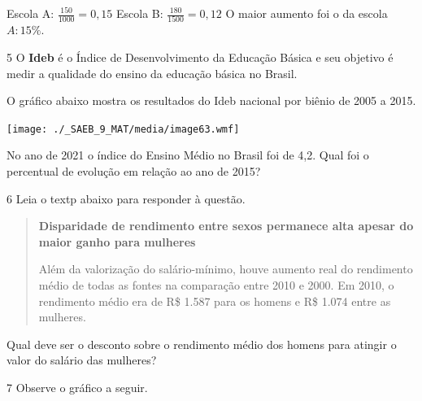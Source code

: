 {{{Escola A: $\frac{150}{1000} = 0,15$
Escola B: $\frac{180}{1500} = 0,12$
O maior aumento foi o da escola $A: 15\%$.}

\num{5} O \textbf{Ideb} é o Índice de Desenvolvimento da
Educação Básica e seu objetivo é medir a qualidade do ensino da
educação básica no Brasil.

O gráfico abaixo mostra os resultados do Ideb nacional por biênio de
2005 a 2015.

\texttt{[image: ./\_SAEB\_9\_MAT/media/image63.wmf]}

No ano de 2021 o índice do Ensino Médio no Brasil foi de 4,2. Qual foi 
o percentual de evolução em relação ao ano de 2015?


\num{6} Leia o textp abaixo para responder à questão.

\begin{quote}

\textbf{Disparidade de rendimento entre sexos permanece alta
apesar do maior ganho para mulheres}

Além da valorização do salário-mínimo, houve aumento real do rendimento
médio de todas as fontes na comparação entre 2010 e 2000. Em 2010, o
rendimento médio era de R\$ 1.587 para os homens e R\$ 1.074 entre as
mulheres.

\end{quote}


Qual deve ser o desconto sobre o rendimento médio dos homens para
atingir o valor do salário das mulheres?


\num{7} Observe o gráfico a seguir. 

}}
